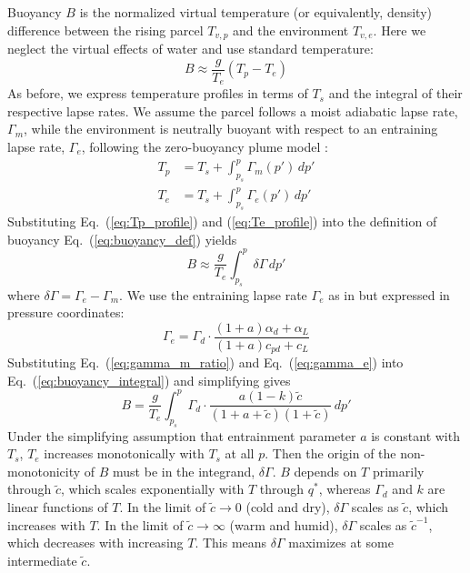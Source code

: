 \documentclass[]{ametsocV6.1}
\begin{document}
Buoyancy $B$ is the normalized virtual temperature (or equivalently, density) difference between the rising parcel $T_{v,p}$ and the environment $T_{v,e}$. Here we neglect the virtual effects of water and use standard temperature:
\begin{equation}
B\approx\frac{g}{T_e}(T_p-T_e) \label{eq:buoyancy_def}
\end{equation}
As before, we express temperature profiles in terms of $T_s$ and the integral of their respective lapse rates. We assume the parcel follows a moist adiabatic lapse rate, $\Gamma_m$, while the environment is neutrally buoyant with respect to an entraining lapse rate, $\Gamma_e$, following the zero-buoyancy plume model \citep{singh2013}:
\begin{align}
T_p&=T_s+\int_{p_s}^p \Gamma_m(p') \, dp' \label{eq:Tp_profile} \\
T_e&=T_s+\int_{p_s}^p \Gamma_e(p') \, dp' \label{eq:Te_profile}
\end{align}
Substituting Eq.~(\ref{eq:Tp_profile}) and (\ref{eq:Te_profile}) into the definition of buoyancy Eq.~(\ref{eq:buoyancy_def}) yields
\begin{equation}
B\approx\frac{g}{T_e}\int_{p_s}^p \delta \Gamma \, dp' \label{eq:buoyancy_integral}
\end{equation}
where $\delta\Gamma = \Gamma_e - \Gamma_m$. We use the entraining lapse rate $\Gamma_e$ as in \cite{romps2016} but expressed in pressure coordinates:
\begin{equation}
\Gamma_e = \Gamma_d \cdot \frac{(1+a)\alpha_d + \alpha_L}{(1+a)c_{pd}+c_L} \label{eq:gamma_e}
\end{equation}
Substituting Eq.~(\ref{eq:gamma_m_ratio}) and Eq.~(\ref{eq:gamma_e}) into Eq.~(\ref{eq:buoyancy_integral}) and simplifying gives
\begin{equation}
    B = \frac{g}{T_e}\int_{p_s}^p \Gamma_d \cdot \frac{a(1-k)\tilde{c}}{(1+a+\tilde{c})(1+\tilde{c})} \, dp' \label{eq:buoyancy_final}
\end{equation}
Under the simplifying assumption that entrainment parameter $a$ is constant with $T_s$, $T_e$ increases monotonically with $T_s$ at all $p$. Then the origin of the non-monotonicity of $B$ must be in the integrand, $\delta \Gamma$. $B$ depends on $T$ primarily through $\tilde{c}$, which scales exponentially with $T$ through $q^*$, whereas $\Gamma_d$ and $k$ are linear functions of $T$. In the limit of $\tilde{c} \to 0$ (cold and dry), $\delta\Gamma$ scales as $\tilde{c}$, which increases with $T$. In the limit of $\tilde{c} \to \infty$ (warm and humid), $\delta\Gamma$ scales as $\tilde{c}^{-1}$, which decreases with increasing $T$. This means $\delta \Gamma$ maximizes at some intermediate $\tilde{c}$.
\end{document}

